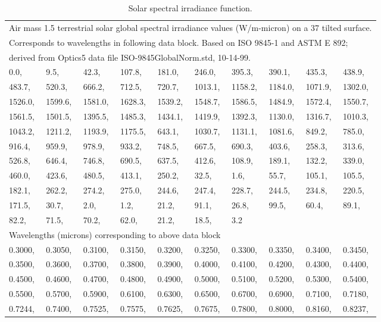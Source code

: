 \begin{longtable}[c]{p{0.5in}p{0.5in}p{0.5in}p{0.5in}p{0.5in}p{0.5in}p{0.5in}p{0.5in}p{0.5in}p{0.5in}}

\caption{Solar spectral irradiance function. \label{table:solar-spectral-irradiance-function.}} \tabularnewline
\toprule 
\endfirsthead

\caption[]{Solar spectral irradiance function.} \tabularnewline
\toprule 
\endhead

\multicolumn{10}{l}{Air mass 1.5 terrestrial solar global spectral irradiance values (W/m-micron) on a 37 tilted surface.} \tabularnewline
\multicolumn{10}{l}{Corresponds to wavelengths in following data block. Based on ISO 9845-1 and ASTM E 892;} \tabularnewline
\multicolumn{10}{l}{derived from Optics5 data file ISO-9845GlobalNorm.std, 10-14-99.} \tabularnewline
\midrule
\endhead
0.0, & 9.5, & 42.3, & 107.8, & 181.0, & 246.0, & 395.3, & 390.1, & 435.3, & 438.9, \tabularnewline 
483.7, & 520.3, & 666.2, & 712.5, & 720.7, & 1013.1, & 1158.2, & 1184.0, & 1071.9, & 1302.0, \tabularnewline 
1526.0, & 1599.6, & 1581.0, & 1628.3, & 1539.2, & 1548.7, & 1586.5, & 1484.9, & 1572.4, & 1550.7, \tabularnewline 
1561.5, & 1501.5, & 1395.5, & 1485.3, & 1434.1, & 1419.9, & 1392.3, & 1130.0, & 1316.7, & 1010.3, \tabularnewline 
1043.2, & 1211.2, & 1193.9, & 1175.5, & 643.1, & 1030.7, & 1131.1, & 1081.6, & 849.2, & 785.0, \tabularnewline 
916.4, & 959.9, & 978.9, & 933.2, & 748.5, & 667.5, & 690.3, & 403.6, & 258.3, & 313.6, \tabularnewline 
526.8, & 646.4, & 746.8, & 690.5, & 637.5, & 412.6, & 108.9, & 189.1, & 132.2, & 339.0, \tabularnewline 
460.0, & 423.6, & 480.5, & 413.1, & 250.2, & 32.5, & 1.6, & 55.7, & 105.1, & 105.5, \tabularnewline 
182.1, & 262.2, & 274.2, & 275.0, & 244.6, & 247.4, & 228.7, & 244.5, & 234.8, & 220.5, \tabularnewline 
171.5, & 30.7, & 2.0, & 1.2, & 21.2, & 91.1, & 26.8, & 99.5, & 60.4, & 89.1, \tabularnewline 
82.2, & 71.5, & 70.2, & 62.0, & 21.2, & 18.5, & 3.2 \tabularnewline \midrule
\multicolumn{10}{l}{Wavelengths (microns) corresponding to above data block} \tabularnewline \midrule
0.3000, & 0.3050, & 0.3100, & 0.3150, & 0.3200, & 0.3250, & 0.3300, & 0.3350, & 0.3400, & 0.3450, \tabularnewline 
0.3500, & 0.3600, & 0.3700, & 0.3800, & 0.3900, & 0.4000, & 0.4100, & 0.4200, & 0.4300, & 0.4400, \tabularnewline  
0.4500, & 0.4600, & 0.4700, & 0.4800, & 0.4900, & 0.5000, & 0.5100, & 0.5200, & 0.5300, & 0.5400, \tabularnewline
0.5500, & 0.5700, & 0.5900, & 0.6100, & 0.6300, & 0.6500, & 0.6700, & 0.6900, & 0.7100, & 0.7180, \tabularnewline
0.7244, & 0.7400, & 0.7525, & 0.7575, & 0.7625, & 0.7675, & 0.7800, & 0.8000, & 0.8160, & 0.8237, \tabularnewline

\end{longtable}
